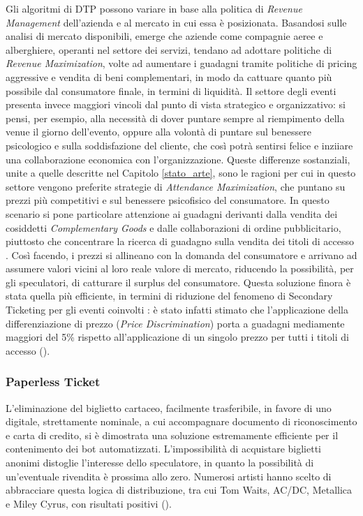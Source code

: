 Gli algoritmi di DTP possono variare in base alla politica di \textit{Revenue Management} \cite{drayer2012dynamic} dell'azienda e al mercato in cui essa è posizionata. Basandosi sulle analisi di mercato disponibili, emerge che aziende come compagnie aeree e alberghiere, operanti nel settore dei servizi, tendano ad adottare politiche di \textit{Revenue Maximization}, volte ad aumentare i guadagni tramite politiche di pricing aggressive e vendita di beni complementari, in modo da cattuare quanto più possibile dal consumatore finale, in termini di liquidità. Il settore degli eventi presenta invece maggiori vincoli dal punto di vista strategico e organizzativo: si pensi, per esempio, alla necessità di dover puntare sempre al riempimento della venue il giorno dell'evento, oppure alla volontà di puntare sul benessere psicologico e sulla soddisfazione del cliente, che così potrà sentirsi felice e inziiare una collaborazione economica con l'organizzazione. Queste differenze sostanziali, unite a quelle descritte nel Capitolo \ref{stato_arte}, sono le ragioni per cui in questo settore vengono preferite strategie di \textit{Attendance Maximization}, che puntano su prezzi più competitivi e sul benessere psicofisico del consumatore. In questo scenario si pone particolare attenzione ai guadagni derivanti dalla vendita dei cosiddetti \textit{Complementary Goods} e dalle collaborazioni di ordine pubblicitario, piuttosto che concentrare la ricerca di guadagno sulla vendita dei titoli di accesso \cite{drayer2012dynamic}.
Così facendo, i prezzi si allineano con la domanda del consumatore e arrivano ad assumere valori vicini al loro reale valore di mercato, riducendo la possibilità, per gli speculatori, di catturare il surplus del consumatore.
Questa soluzione finora è stata quella più efficiente, in termini di riduzione del fenomeno di Secondary Ticketing per gli eventi coinvolti \cite{loewenstein2010ticket}: è stato infatti stimato che l'applicazione della differenziazione di prezzo (\textit{Price Discrimination}) porta a guadagni mediamente maggiori del 5\% rispetto all'applicazione di un singolo prezzo per tutti i titoli di accesso (\cite{courty2012impact}). 

\subsubsection{Paperless Ticket}
L'eliminazione del biglietto cartaceo, facilmente trasferibile, in favore di uno digitale, strettamente nominale, a cui accompagnare documento di riconoscimento e carta di credito, si è dimostrata una soluzione estremamente efficiente per il contenimento dei bot automatizzati. L'impossibilità di acquistare biglietti anonimi distoglie l'interesse dello speculatore, in quanto la possibilità di un'eventuale rivendita è prossima allo zero.
Numerosi artisti hanno scelto di abbracciare questa logica di distribuzione, tra cui Tom Waits, AC/DC, Metallica e Miley Cyrus, con risultati positivi (\cite{drayer2011examining}).
